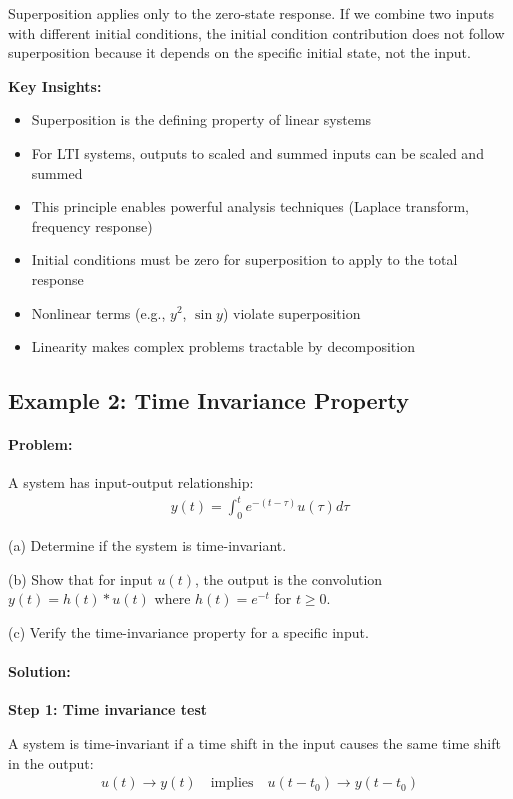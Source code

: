 \documentclass[11pt,a4paper]{article}
\begin{document}
Superposition applies only to the zero-state response. If we combine two inputs with different initial conditions, the initial condition contribution does not follow superposition because it depends on the specific initial state, not the input.

\textbf{Key Insights:}
\begin{itemize}
\item Superposition is the defining property of linear systems
\item For LTI systems, outputs to scaled and summed inputs can be scaled and summed
\item This principle enables powerful analysis techniques (Laplace transform, frequency response)
\item Initial conditions must be zero for superposition to apply to the total response
\item Nonlinear terms (e.g., $y^2$, $\sin y$) violate superposition
\item Linearity makes complex problems tractable by decomposition
\end{itemize}

\subsection{Example 2: Time Invariance Property}

\paragraph{Problem:} A system has input-output relationship:
\begin{align}
y(t) = \int_0^t e^{-(t-\tau)} u(\tau) d\tau
\end{align}

(a) Determine if the system is time-invariant.

(b) Show that for input $u(t)$, the output is the convolution $y(t) = h(t) * u(t)$ where $h(t) = e^{-t}$ for $t \geq 0$.

(c) Verify the time-invariance property for a specific input.

\paragraph{Solution:}

\textbf{Step 1: Time invariance test}

A system is time-invariant if a time shift in the input causes the same time shift in the output:
\begin{align}
u(t) \to y(t) \quad \text{implies} \quad u(t - t_0) \to y(t - t_0)
\end{align}
\end{document}
